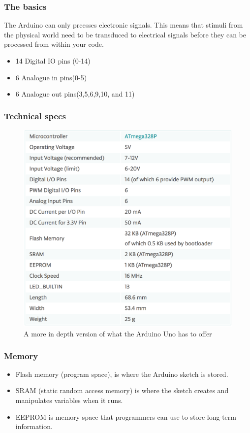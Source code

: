 \begin{frame}
  \frametitle{The basics}  
  The Arduino can only prcesses electronic signals. This means that stimuli from the physical world need to be transduced to electrical signals before they can be processed from within your code. 
  
  \begin{itemize}
    \item 14 Digital IO pins (0-14)
    \item 6 Analogue in pins(0-5)
    \item 6 Analogue out pins(3,5,6,9,10, and 11) ~
  \end{itemize}
\end{frame}

\begin{frame}
	\frametitle{Technical specs}
	\begin{figure}
		\includegraphics[scale=.14]{assets/spec} 
		\caption{A more in depth version of what the Arduino Uno has to offer}
	\end{figure}
\end{frame}

\begin{frame}
	\frametitle{Memory}
	\begin{itemize}
		\item Flash memory (program space), is where the Arduino sketch is stored.
		\item SRAM (static random access memory) is where the sketch creates and manipulates variables when it runs.
		\item EEPROM is memory space that programmers can use to store long-term information.	
	\end{itemize}
\end{frame}


